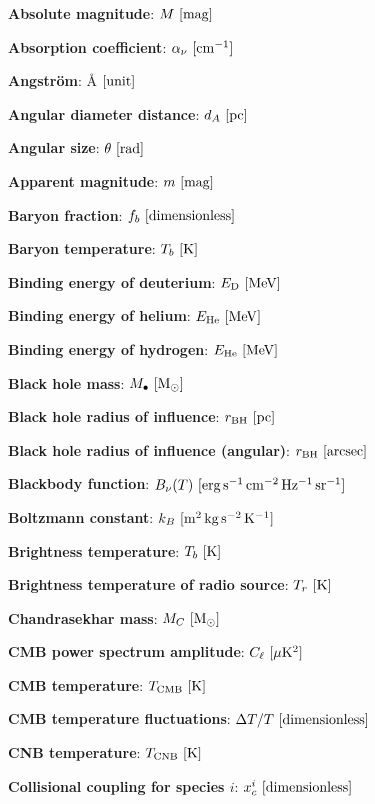 \documentclass[a4paper,11pt]{article}
\begin{document}
{\noindent}\textbf{Absolute magnitude}: $M ~ [{\rm mag}]$

{\noindent}\textbf{Absorption coefficient}: $\alpha_\nu ~ [{\rm cm^{-1}}]$

{\noindent}\textbf{Angstr\"{o}m}: \AA$ ~ [{\rm unit}]$

{\noindent}\textbf{Angular diameter distance}: $d_A ~ [{\rm pc}]$

{\noindent}\textbf{Angular size}: $\theta ~ [{\rm rad}]$

{\noindent}\textbf{Apparent magnitude}: $m ~ [{\rm mag}]$

{\noindent}\textbf{Baryon fraction}: $f_b ~ [{\rm dimensionless}]$

{\noindent}\textbf{Baryon temperature}: $T_b ~ [{\rm K}]$

{\noindent}\textbf{Binding energy of deuterium}: $E_\mathrm{D} ~ [{\rm MeV}]$

{\noindent}\textbf{Binding energy of helium}: $E_\mathrm{He} ~ [{\rm MeV}]$

{\noindent}\textbf{Binding energy of hydrogen}: $E_\mathrm{He} ~ [{\rm MeV}]$

{\noindent}\textbf{Black hole mass}: $M_\bullet ~ [{\rm M_\odot}]$

{\noindent}\textbf{Black hole radius of influence}: $r_\mathrm{BH} ~ [{\rm pc}]$

{\noindent}\textbf{Black hole radius of influence (angular)}: $r_\mathrm{BH} ~ [{\rm arcsec}]$

{\noindent}\textbf{Blackbody function}: $B_\nu(T) ~ [{\rm erg\,s^{-1}\,cm^{-2}\,Hz^{-1}\,sr^{-1}}]$

{\noindent}\textbf{Boltzmann constant}: $k_B ~ [{\rm m^2\,kg\,s^{-2}\,K^{-1}}]$

{\noindent}\textbf{Brightness temperature}: $T_b ~ [{\rm K}]$

{\noindent}\textbf{Brightness temperature of radio source}: $T_r ~ [{\rm K}]$

{\noindent}\textbf{Chandrasekhar mass}: $M_C ~ [{\rm M_\odot}]$

{\noindent}\textbf{CMB power spectrum amplitude}: $C_\ell ~ [{\rm \mu K^2}]$

{\noindent}\textbf{CMB temperature}: $T_\mathrm{CMB} ~ [{\rm K}]$

{\noindent}\textbf{CMB temperature fluctuations}: $\Delta T/T ~ [{\rm dimensionless}]$

{\noindent}\textbf{CNB temperature}: $T_\mathrm{CNB} ~ [{\rm K}]$

{\noindent}\textbf{Collisional coupling for species $i$}: $x_c^i ~ [{\rm
dimensionless}]$
\end{document}
